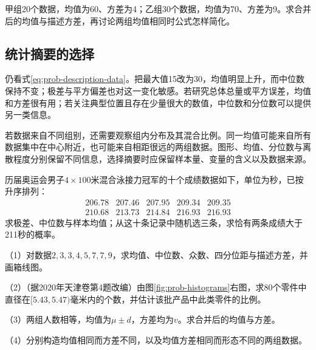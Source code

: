 \begin{example}
甲组20个数据，均值为60、方差为4；乙组30个数据，均值为70、方差为9。求合并后的均值与描述方差，再讨论两组均值相同时公式怎样简化。
\end{example}

\subsection{统计摘要的选择}

仍看式\eqref{eq:prob-description-data}。把最大值15改为30，均值明显上升，而中位数保持不变；极差与平方偏差也对这一变化敏感。若研究总体总量或平方误差，均值和方差很有用；若关注典型位置且存在少量很大的数值，中位数和分位数可以提供另一类信息。

若数据来自不同组别，还需要观察组内分布及其混合比例。同一均值可能来自所有数据集中在中心附近，也可能来自相距很远的两组数据。图形、均值、分位数与离散程度分别保留不同信息，选择摘要时应保留样本量、变量的含义以及数据来源。

\begin{example}[据2025年上海卷改编]\label{ex:prob-swimming-data}
历届奥运会男子\(4\times100\)米混合泳接力冠军的十个成绩数据如下，单位为秒，已按升序排列：
\[
\begin{array}{rrrrr}
206.78&207.46&207.95&209.34&209.35\\
210.68&213.73&214.84&216.93&216.93
\end{array}
\]
求极差、中位数与样本均值；从这十条记录中随机选三条，求恰有两条成绩大于211秒的概率。
\end{example}

\begin{exercise}
\mbox{}\par\nobreak

（1）对数据\(2,3,3,4,5,7,7,9\)，求均值、中位数、众数、四分位距与描述方差，并画箱线图。

（2）（据2020年天津卷第4题改编）由图\ref{fig:prob-histograms}右图，求80个零件中直径在\([5.43,5.47)\)毫米内的个数，并估计该批产品中此类零件的比例。

（3）两组人数相等，均值为\(\mu\pm d\)，方差均为\(v\)。求合并后的均值与方差。

（4）分别构造均值相同而方差不同，以及均值方差相同而形态不同的两组数据。
\end{exercise}
